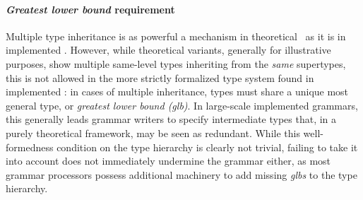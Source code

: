 \paragraph{\emph{Greatest lower bound} requirement}

Multiple type inheritance is as powerful a mechanism in theoretical \hpsg\ as
it is in implemented \hpsg. However, while theoretical variants, generally for
illustrative purposes, show multiple same-level types inheriting from the
\emph{same} supertypes, this is not allowed in the more strictly formalized
type system found in implemented \hpsg: in cases of multiple inheritance, types
must share a unique most general type, or \emph{greatest lower bound (glb)}. In
large-scale implemented grammars, this generally leads grammar writers to
specify intermediate types that, in a purely theoretical framework, may be seen
as redundant. While this well-formedness condition on the type hierarchy is
clearly not trivial, failing to take it into account does not immediately
undermine the grammar either, as most grammar processors possess additional
machinery to add missing \emph{glbs} to the type hierarchy.


